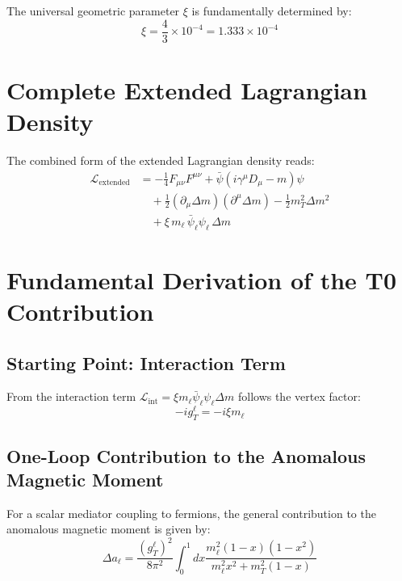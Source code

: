 \documentclass[12pt,a4paper]{article}
\theoremstyle{definition}
\begin{document}
	The universal geometric parameter $\xi$ is fundamentally determined by:
	\begin{equation}
		\xi = \frac{4}{3} \times 10^{-4} = 1.333 \times 10^{-4}
		\label{eq:xi_parameter}
	\end{equation}
	
	\section{Complete Extended Lagrangian Density}
	
	The combined form of the extended Lagrangian density reads:
	\begin{align}
		\mathcal{L}_{\text{extended}} &= -\tfrac{1}{4} F_{\mu\nu}F^{\mu\nu} + \bar{\psi}(i\gamma^\mu D_\mu - m)\psi \nonumber\\
		&\quad + \tfrac{1}{2}(\partial_\mu \Delta m)(\partial^\mu \Delta m) - \tfrac{1}{2} m_T^2 \Delta m^2 \nonumber\\
		&\quad + \xi \, m_\ell \,\bar{\psi}_\ell \psi_\ell \, \Delta m
		\label{eq:extended_lagrangian}
	\end{align}
	
	\section{Fundamental Derivation of the T0 Contribution}
	
	\subsection{Starting Point: Interaction Term}
	
	From the interaction term $\mathcal{L}_{\text{int}} = \xi m_\ell \bar{\psi}_\ell \psi_\ell \Delta m$ follows the vertex factor:
	\begin{equation}
		-i g_T^\ell = -i \xi m_\ell
	\end{equation}
	
	\subsection{One-Loop Contribution to the Anomalous Magnetic Moment}
	
	For a scalar mediator coupling to fermions, the general contribution to the anomalous magnetic moment is given by\cite{peskin_schroeder_1995}:
	\begin{equation}
		\Delta a_\ell = \frac{(g_T^\ell)^2}{8\pi^2} \int_0^1 dx \frac{m_\ell^2 (1-x)(1-x^2)}{m_\ell^2 x^2 + m_T^2 (1-x)}
		\label{eq:one_loop_general}
	\end{equation}
	
\end{document}
